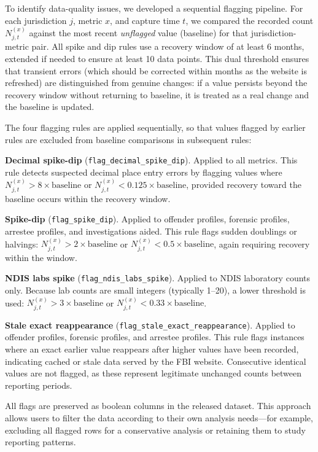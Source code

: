 \documentclass[11pt]{article}
\begin{document}
To identify data-quality issues, we developed a sequential flagging pipeline. For each jurisdiction $j$, metric $x$, and capture time $t$, we compared the recorded count $N_{j,t}^{(x)}$ against the most recent \textit{unflagged} value (baseline) for that jurisdiction-metric pair. All spike and dip rules use a recovery window of at least 6 months, extended if needed to ensure at least 10 data points. This dual threshold ensures that transient errors (which should be corrected within months as the website is refreshed) are distinguished from genuine changes: if a value persists beyond the recovery window without returning to baseline, it is treated as a real change and the baseline is updated.

The four flagging rules are applied sequentially, so that values flagged by earlier rules are excluded from baseline comparisons in subsequent rules:

\textbf{Decimal spike-dip} (\texttt{flag\_decimal\_spike\_dip}). Applied to all metrics. This rule detects suspected decimal place entry errors by flagging values where $N_{j,t}^{(x)} > 8 \times \text{baseline}$ or $N_{j,t}^{(x)} < 0.125 \times \text{baseline}$, provided recovery toward the baseline occurs within the recovery window.

\textbf{Spike-dip} (\texttt{flag\_spike\_dip}). Applied to offender profiles, forensic profiles, arrestee profiles, and investigations aided. This rule flags sudden doublings or halvings: $N_{j,t}^{(x)} > 2 \times \text{baseline}$ or $N_{j,t}^{(x)} < 0.5 \times \text{baseline}$, again requiring recovery within the window.

\textbf{NDIS labs spike} (\texttt{flag\_ndis\_labs\_spike}). Applied to NDIS laboratory counts only. Because lab counts are small integers (typically 1--20), a lower threshold is used: $N_{j,t}^{(x)} > 3 \times \text{baseline}$ or $N_{j,t}^{(x)} < 0.33 \times \text{baseline}$.

\textbf{Stale exact reappearance} (\texttt{flag\_stale\_exact\_reappearance}). Applied to offender profiles, forensic profiles, and arrestee profiles. This rule flags instances where an exact earlier value reappears after higher values have been recorded, indicating cached or stale data served by the FBI website. Consecutive identical values are not flagged, as these represent legitimate unchanged counts between reporting periods.

All flags are preserved as boolean columns in the released dataset. This approach allows users to filter the data according to their own analysis needs---for example, excluding all flagged rows for a conservative analysis or retaining them to study reporting patterns.
\end{document}

